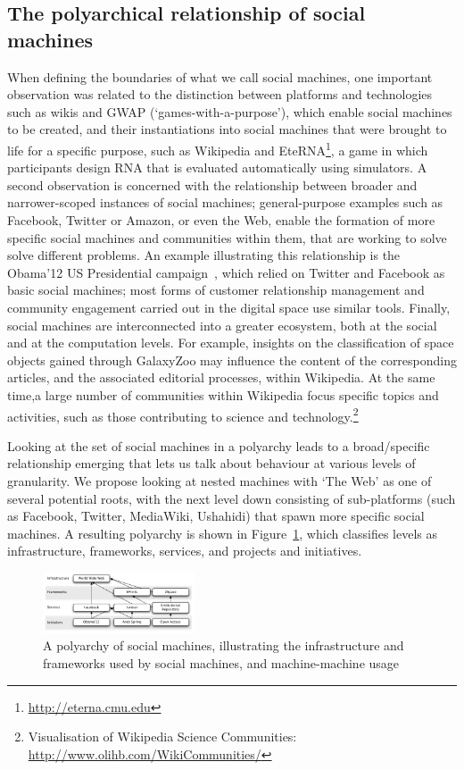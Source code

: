 \documentclass{sig-alternate}
\begin{document}
\subsection{The polyarchical relationship of social machines}
When defining the boundaries of what we call social machines, one important observation was related to the distinction between platforms and technologies such as wikis and GWAP (`games-with-a-purpose'), which enable social machines to be created, and their instantiations into social machines that were brought to life for a specific purpose, such as Wikipedia and EteRNA\footnote{\url{http://eterna.cmu.edu}}, a game in which participants design RNA that is evaluated automatically using simulators. A second observation is concerned with the relationship between broader and narrower-scoped instances of social machines; general-purpose examples such as Facebook, Twitter or Amazon, or even the Web, enable the formation of more specific social machines and communities within them, that are working to solve solve different problems. An example illustrating this relationship is the Obama'12 US Presidential campaign~\cite{obamakieron}, which relied on Twitter and Facebook as basic social machines; most forms of customer relationship management and community engagement carried out in the digital space use similar tools. Finally, social machines are interconnected into a greater ecosystem, both at the social and at the computation levels. For example, insights on the classification of space objects gained through GalaxyZoo may influence the content of the corresponding articles, and the associated editorial processes, within Wikipedia. At the same time,a large number of communities within Wikipedia focus specific topics and activities, such as those contributing to science and technology.\footnote{Visualisation of Wikipedia Science Communities: \url{http://www.olihb.com/WikiCommunities/}}

Looking at the set of social machines in a polyarchy leads to a broad/specific relationship emerging that lets us talk about behaviour at various levels of granularity. We propose looking at nested machines with `The Web' as one of several potential roots, with the next level down consisting of sub-platforms (such as Facebook, Twitter, MediaWiki, Ushahidi) that spawn more specific social machines. A resulting polyarchy is shown in Figure~\ref{polyarchy}, which classifies levels as infrastructure, frameworks, services, and projects and initiatives.

\begin{figure}[htb]
\begin{center}
\includegraphics[width=0.4\textwidth]{img/polyarchy.pdf}
\caption{A polyarchy of social machines, illustrating the infrastructure and frameworks used by social machines, and machine-machine usage} \label{polyarchy}
\end{center}
\end{figure}
\end{document}
